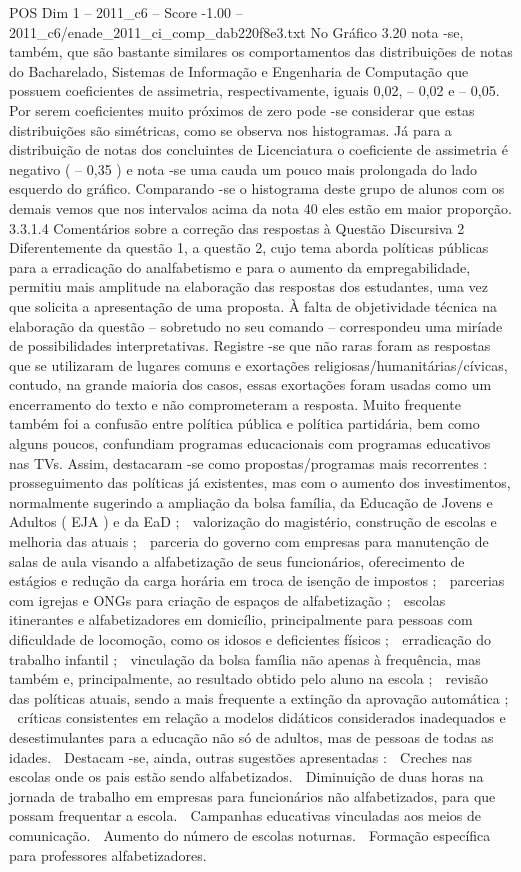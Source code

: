 \begin{textsample}{POS Dim 1 – 2011\_c6 – Score -1.00 – 2011\_c6/enade\_2011\_ci\_comp\_dab220f8e3.txt}
No Gráfico 3.20 nota -se, também, que são bastante similares os comportamentos das distribuições de notas do Bacharelado, Sistemas de Informação e Engenharia de Computação que possuem coeficientes de assimetria, respectivamente, iguais 0,02, – 0,02 e – 0,05.
Por serem coeficientes muito próximos de zero pode -se considerar que estas distribuições são simétricas, como se observa nos histogramas.
Já para a distribuição de notas dos concluintes de Licenciatura o coeficiente de assimetria é negativo ( – 0,35 ) e nota -se uma cauda um pouco mais prolongada do lado esquerdo do gráfico.
Comparando -se o histograma deste grupo de alunos com os demais vemos que nos intervalos acima da nota 40 eles estão em maior proporção. 3.3.1.4 Comentários sobre a correção das respostas à Questão Discursiva 2 Diferentemente da questão 1, a questão 2, cujo tema aborda políticas públicas para a erradicação do analfabetismo e para o aumento da empregabilidade, permitiu mais amplitude na elaboração das respostas dos estudantes, uma vez que solicita a apresentação de uma proposta.
À falta de objetividade técnica na elaboração da questão – sobretudo no seu comando – correspondeu uma miríade de possibilidades interpretativas.
Registre -se que não raras foram as respostas que se utilizaram de lugares comuns e exortações religiosas/humanitárias/cívicas, contudo, na grande maioria dos casos, essas exortações foram usadas como um encerramento do texto e não comprometeram a resposta.
Muito frequente também foi a confusão entre política pública e política partidária, bem como alguns poucos, confundiam programas educacionais com programas educativos nas TVs.
Assim, destacaram -se como propostas/programas mais recorrentes :  prosseguimento das políticas já existentes, mas com o aumento dos investimentos, normalmente sugerindo a ampliação da bolsa família, da Educação de Jovens e Adultos ( EJA ) e da EaD ;  valorização do magistério, construção de escolas e melhoria das atuais ;  parceria do governo com empresas para manutenção de salas de aula visando a alfabetização de seus funcionários, oferecimento de estágios e redução da carga horária em troca de isenção de impostos ;  parcerias com igrejas e ONGs para criação de espaços de alfabetização ;  escolas itinerantes e alfabetizadores em domicílio, principalmente para pessoas com dificuldade de locomoção, como os idosos e deficientes físicos ;  erradicação do trabalho infantil ;  vinculação da bolsa família não apenas à frequência, mas também e, principalmente, ao resultado obtido pelo aluno na escola ;  revisão das políticas atuais, sendo a mais frequente a extinção da aprovação automática ;  críticas consistentes em relação a modelos didáticos considerados inadequados e desestimulantes para a educação não só de adultos, mas de pessoas de todas as idades.  Destacam -se, ainda, outras sugestões apresentadas :  Creches nas escolas onde os pais estão sendo alfabetizados.  Diminuição de duas horas na jornada de trabalho em empresas para funcionários não alfabetizados, para que possam frequentar a escola.  Campanhas educativas vinculadas aos meios de comunicação.  Aumento do número de escolas noturnas.  Formação específica para professores alfabetizadores.

\end{textsample}
